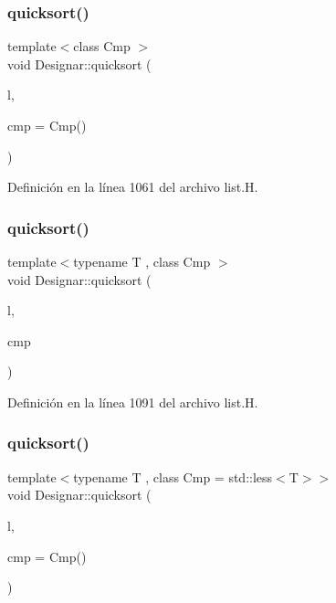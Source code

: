 \subsubsection{\texorpdfstring{quicksort()}{quicksort()}\hspace{0.1cm}{\footnotesize\ttfamily [5/14]}}
{\footnotesize\ttfamily template$<$class Cmp $>$ \\
void Designar\+::quicksort (\begin{DoxyParamCaption}\item[{\hyperlink{class_designar_1_1_d_l}{DL} \&}]{l,  }\item[{Cmp \&\&}]{cmp = {\ttfamily Cmp()} }\end{DoxyParamCaption})\hspace{0.3cm}{\ttfamily [inline]}}



Definición en la línea 1061 del archivo list.\+H.

\mbox{\label{namespace_designar_a5e44455a1442b74351b0fb9f9519581f}} 
\subsubsection{\texorpdfstring{quicksort()}{quicksort()}\hspace{0.1cm}{\footnotesize\ttfamily [6/14]}}
{\footnotesize\ttfamily template$<$typename T , class Cmp $>$ \\
void Designar\+::quicksort (\begin{DoxyParamCaption}\item[{\hyperlink{class_designar_1_1_d_l_node}{D\+L\+Node}$<$ T $>$ \&}]{l,  }\item[{Cmp \&}]{cmp }\end{DoxyParamCaption})\hspace{0.3cm}{\ttfamily [inline]}}



Definición en la línea 1091 del archivo list.\+H.

\mbox{\label{namespace_designar_a5a756296262619dd1deb6195ad0ec2a0}} 
\subsubsection{\texorpdfstring{quicksort()}{quicksort()}\hspace{0.1cm}{\footnotesize\ttfamily [7/14]}}
{\footnotesize\ttfamily template$<$typename T , class Cmp  = std\+::less$<$\+T$>$$>$ \\
void Designar\+::quicksort (\begin{DoxyParamCaption}\item[{\hyperlink{class_designar_1_1_d_l_node}{D\+L\+Node}$<$ T $>$ \&}]{l,  }\item[{Cmp \&\&}]{cmp = {\ttfamily Cmp()} }\end{DoxyParamCaption})\hspace{0.3cm}{\ttfamily [inline]}}



